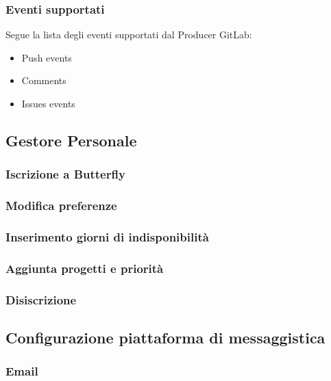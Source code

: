 \subsubsection{Eventi supportati}
Segue la lista degli eventi supportati dal Producer GitLab:
\begin{itemize}
    \item Push events
    \item Comments
    \item Issues events
\end{itemize}


\subsection{Gestore Personale}

\subsubsection{Iscrizione a Butterfly}

\subsubsection{Modifica preferenze}

\subsubsection{Inserimento giorni di indisponibilità}

\subsubsection{Aggiunta progetti e priorità}

\subsubsection{Disiscrizione}

\subsection{Configurazione piattaforma di messaggistica}

\subsubsection{Email}

